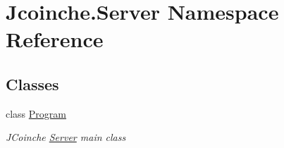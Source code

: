 \hypertarget{namespace_jcoinche_1_1_server}{}\section{Jcoinche.\+Server Namespace Reference}
\label{namespace_jcoinche_1_1_server}
\subsection*{Classes}
\begin{DoxyCompactItemize}
\item 
class \hyperlink{class_jcoinche_1_1_server_1_1_program}{Program}
\begin{DoxyCompactList}\small\item\em J\+Coinche \hyperlink{namespace_jcoinche_1_1_server}{Server} main class \end{DoxyCompactList}\end{DoxyCompactItemize}
